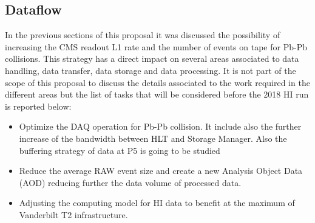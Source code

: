\subsection{Dataflow\label{subsec:dataflow}}
In the previous sections of this proposal it was discussed the possibility of increasing the CMS readout L1 rate and the number of events on tape for Pb-Pb collisions. This strategy has a direct impact on several areas associated to data handling, data transfer, data storage and data processing. It is not part of the scope of this proposal to discuss the details associated to the work required in the different areas but the list of tasks that will be considered before the 2018 HI run is reported below:

\begin{itemize}
\item Optimize the DAQ operation for Pb-Pb collision. It include also the further increase of the bandwidth between HLT and Storage Manager. Also the buffering strategy of data at P5 is going to be studied

\item Reduce the average RAW event size and create a new Analysis Object Data (AOD) reducing further the data volume of processed data.

\item Adjusting the computing model for HI data to benefit at the maximum of Vanderbilt T2 infrastructure.
\end{itemize}

